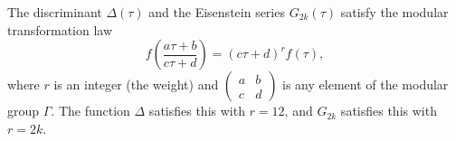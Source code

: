 The discriminant $\Delta(\tau)$ and the Eisenstein series $G_{2k}(\tau)$ satisfy the modular transformation law
$$f\left(\frac{a\tau + b}{c\tau + d}\right) = (c\tau + d)^r f(\tau),$$
where $r$ is an integer (the weight) and $\begin{pmatrix} a & b \\ c & d \end{pmatrix}$ is any element of the modular group $\Gamma$. The function $\Delta$ satisfies this with $r = 12$, and $G_{2k}$ satisfies this with $r = 2k$.
